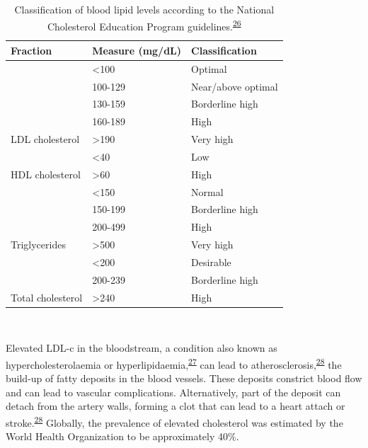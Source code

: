 \documentclass[a4paper, twoside]{templates/ociamthesis}
\begin{document}
\begin{table}[H]

\caption[Classification of blood lipid levels]{\label{tab:lipidLevels-table}Classification of blood lipid levels according to the National Cholesterol Education Program guidelines.\textsuperscript{\protect\hyperlink{ref-national2002third}{26}}}
\centering
\begin{tabular}[t]{lll}
\toprule
\textbf{Fraction} & \textbf{Measure (mg/dL)} & \textbf{Classification}\\
\midrule
 & <100 & Optimal\\
\cmidrule{2-3}
 & 100-129 & Near/above optimal\\
\cmidrule{2-3}
 & 130-159 & Borderline high\\
\cmidrule{2-3}
 & 160-189 & High\\
\cmidrule{2-3}
\multirow{-5}{*}{\raggedright\arraybackslash LDL cholesterol} & >190 & Very high\\
\cmidrule{1-3}
 & <40 & Low\\
\cmidrule{2-3}
\multirow{-2}{*}{\raggedright\arraybackslash HDL cholesterol} & >60 & High\\
\cmidrule{1-3}
 & <150 & Normal\\
\cmidrule{2-3}
 & 150-199 & Borderline high\\
\cmidrule{2-3}
 & 200-499 & High\\
\cmidrule{2-3}
\multirow{-4}{*}{\raggedright\arraybackslash Triglycerides} & >500 & Very high\\
\cmidrule{1-3}
 & <200 & Desirable\\
\cmidrule{2-3}
 & 200-239 & Borderline high\\
\cmidrule{2-3}
\multirow{-3}{*}{\raggedright\arraybackslash Total cholesterol} & >240 & High\\
\bottomrule
\end{tabular}
\end{table}

~

Elevated LDL-c in the bloodstream, a condition also known as hypercholesterolaemia or hyperlipidaemia,\textsuperscript{\protect\hyperlink{ref-nelson2013}{27}} can lead to atherosclerosis,\textsuperscript{\protect\hyperlink{ref-libby2019}{28}} the build-up of fatty deposits in the blood vessels. These deposits constrict blood flow and can lead to vascular complications. Alternatively, part of the deposit can detach from the artery walls, forming a clot that can lead to a heart attach or stroke.\textsuperscript{\protect\hyperlink{ref-libby2019}{28}} Globally, the prevalence of elevated cholesterol was estimated by the World Health Organization to be approximately 40\%.
\end{document}
